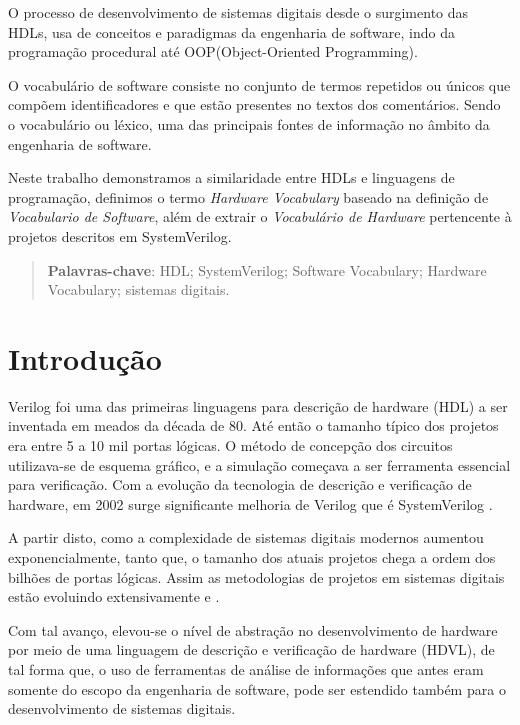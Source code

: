 \documentclass[12pt, twocolumn, a4paper]{article}
\begin{document}
O processo de desenvolvimento de sistemas digitais desde o surgimento das HDLs, usa de conceitos e paradigmas da engenharia de software, indo da programação procedural até OOP(Object-Oriented Programming). %

O vocabulário de software consiste no conjunto de termos repetidos ou únicos que compõem identificadores e que estão presentes no textos dos comentários. Sendo o vocabulário ou léxico, uma das principais fontes de informação no âmbito da engenharia de software. %


Neste trabalho demonstramos a similaridade entre HDLs e linguagens de programação, definimos o termo \textit{Hardware Vocabulary} baseado na definição de \textit{Vocabulario de Software}, além de extrair o \textit{Vocabulário de Hardware} pertencente à projetos descritos em SystemVerilog. %
\begin{quote}
\textbf{Palavras-chave}: HDL; SystemVerilog; Software Vocabulary; Hardware Vocabulary; sistemas digitais.
\end{quote}

	\section{Introdução}

\quad Verilog foi uma das primeiras linguagens para descrição de hardware (HDL) a ser inventada em meados da década de 80. Até então o tamanho típico dos projetos era entre 5 a 10 mil portas lógicas. O método de concepção dos circuitos utilizava-se de esquema gráfico, e a simulação começava a ser  ferramenta essencial para verificação\cite{sutherland2006}. Com a evolução da tecnologia de descrição e verificação de hardware, em 2002 surge significante melhoria de Verilog que é SystemVerilog \cite{sutherland2006}. 

A partir disto, como a complexidade de sistemas digitais modernos aumentou exponencialmente, tanto que, o tamanho dos atuais projetos chega a ordem dos bilhões de portas lógicas. Assim as metodologias de projetos em sistemas digitais estão evoluindo extensivamente \cite{Marc-Andre} e \cite{Hahanov2008}.

Com tal avanço, elevou-se o nível de abstração no desenvolvimento de hardware por meio de uma linguagem de descrição e verificação de hardware (HDVL), de tal forma que, o uso de ferramentas de análise de informações que antes eram somente do escopo da engenharia de software, pode ser estendido também para o desenvolvimento de sistemas digitais.
\end{document}
